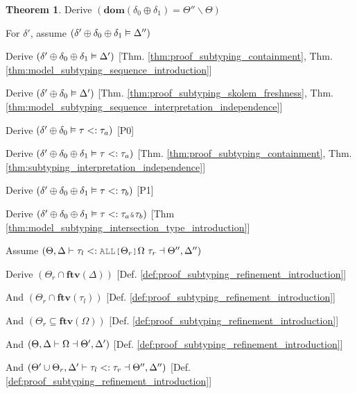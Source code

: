 \documentclass[acmsmall]{acmart}
\theoremstyle{definition}
\newtheorem{theorem}{Theorem}[section]
\begin{document}
\begin{theorem}
  \item \I \N Derive $(
    \textbf{dom}(\delta_0 \oplus \delta_1) = \Theta'' \backslash \Theta
  )$
  \item \I \N For $\delta'$, assume $(\delta' \oplus \delta_0 \oplus \delta_1 \vDash \Delta'')$

  \item \I\I \N Derive $(\delta' \oplus \delta_0 \oplus \delta_1 \vDash \Delta')$
    [Thm. \ref{thm:proof_subtyping_containment}, Thm. \ref{thm:model_subtyping_sequence_introduction}]
  \item \I\I \N Derive $(\delta' \oplus \delta_0 \vDash \Delta')$
    [Thm. \ref{thm:proof_subtyping_skolem_freshness}, Thm. \ref{thm:model_subtyping_sequence_interpretation_independence}]
  \item \I\I \N Derive $(
    \delta' \oplus \delta_0 \vDash \tau <: \tau_a
  )$ [P0]

  \item \I\I \N Derive $(
    \delta' \oplus \delta_0 \oplus \delta_1 \vDash \tau <: \tau_a
  )$ [Thm. \ref{thm:proof_subtyping_containment}, Thm. \ref{thm:subtyping_interpretation_independence}]

  \item \I\I \N Derive $(
    \delta' \oplus \delta_0 \oplus \delta_1 \vDash \tau <: \tau_b
  )$ [P1]

  \item \I\I \N Derive $(
    \delta' \oplus \delta_0 \oplus \delta_1 \satisfies \tau \subtypes \tau_a \J{\&} \tau_b
  )$ [Thm \ref{thm:model_subtyping_intersection_type_introduction}]


  \item \N Assume $(
    \Theta, \Delta \entails \tau_l \subtypes \J{ALL[}\Theta_r\J{]}\Omega\ \tau_r \given \Theta'', \Delta''
  )$
  \item \I \N Derive $(
    \Theta_r \cap \textbf{ftv}(\Delta)
  )$ [Def. \ref{def:proof_subtyping_refinement_introduction}]
  \item \I \N And $(
    \Theta_r \cap \textbf{ftv}(\tau_l)
  )$ [Def. \ref{def:proof_subtyping_refinement_introduction}]
  \item \I \N And $(
    \Theta_r \subseteq \textbf{ftv}(\Omega)
  )$ [Def. \ref{def:proof_subtyping_refinement_introduction}]
  \item \I \N And $(
    \Theta, \Delta \vdash \Omega \dashv \Theta', \Delta'
  )$ [Def. \ref{def:proof_subtyping_refinement_introduction}]
  \item \I \N And $(
    \Theta' \cup \Theta_r, \Delta' \vdash
    \tau_l <: \tau_r \dashv \Theta'', \Delta''
  )$ [Def. \ref{def:proof_subtyping_refinement_introduction}]


\end{theorem}
\end{document}
